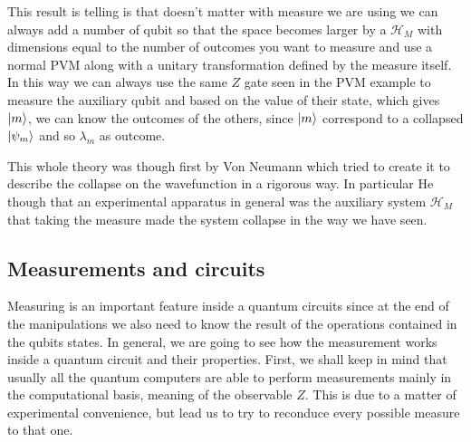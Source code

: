 \noindent
This result is telling is that doesn't matter with measure we are using we can always add a number of qubit so that the space becomes larger by a $\mathcal{H}_M$ with dimensions equal to the number of outcomes you want to measure and use a normal PVM along with a unitary transformation defined by the measure itself. In this way we can always use the same $Z$ gate seen in the PVM example to measure the auxiliary qubit and based on the value of their state, which gives $\ket{m}$, we can know the outcomes of the others, since $\ket{m}$ correspond to a collapsed $\ket{\psi_m}$ and so $\lambda_m$ as outcome.

\nt
{
    This whole theory was though first by Von Neumann which tried to create it to describe the collapse on the wavefunction in a rigorous way. In particular He though that an experimental apparatus in general was the auxiliary system $\mathcal{H}_M$ that taking the measure made the system collapse in the way we have seen.
}

\subsection{Measurements and circuits}

Measuring is an important feature inside a quantum circuits since at the end of the manipulations we also need to know the result of the operations contained in the qubits states. In general, we are going to see how the measurement works inside a quantum circuit and their properties. First, we shall keep in mind that usually all the quantum computers are able to perform measurements mainly in the computational basis, meaning of the observable $Z$. This is due to a matter of experimental convenience, but lead us to try to reconduce every possible measure to that one.



